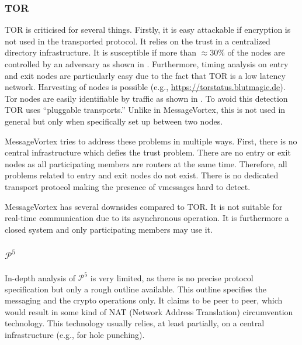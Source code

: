 \documentclass[runningheads]{llncs}
\begin{document}
\subsubsection{TOR}
%
TOR is criticised for several things. Firstly, it is easy attackable if encryption is not used in the transported protocol. It relies on the trust in a centralized directory infrastructure. It is susceptible if more than $\approx 30\%$ of the nodes are controlled by an adversary as shown in \cite{jansen2014sniper}. Furthermore, timing analysis on entry and exit nodes are particularly easy due to the fact that TOR is a low latency network\cite{torta05,esorics10-bandwidth}. Harvesting of nodes is possible (e.g., \url{https://torstatus.blutmagie.de}). Tor nodes are easily identifiable by traffic as shown in \cite{foci12-winter}. To avoid this detection TOR uses ``pluggable transports.'' Unlike in MessageVortex, this is not used in general but only when specifically set up between two nodes.

MessageVortex tries to address these problems in multiple ways. First, there is no central infrastructure which defies the trust problem. There are no entry or exit nodes as all participating members are routers at the same time. Therefore, all problems related to entry and exit nodes do not exist. There is no dedicated transport protocol making the presence of vmessages hard to detect.

MessageVortex has several downsides compared to TOR. It is not suitable for real-time communication due to its asynchronous operation. It is furthermore a closed system and only participating members may use it. %

\subsubsection{$\mathcal{P}^5$}
%
In-depth analysis of $\mathcal{P}^5$ is very limited, as there is no precise protocol specification but only a rough outline available. This outline specifies the messaging and the crypto operations only. It claims to be peer to peer, which would result in some kind of NAT (Network Address Translation) circumvention technology. This technology usually relies, at least partially, on a central infrastructure (e.g., for hole punching). 
\end{document}
